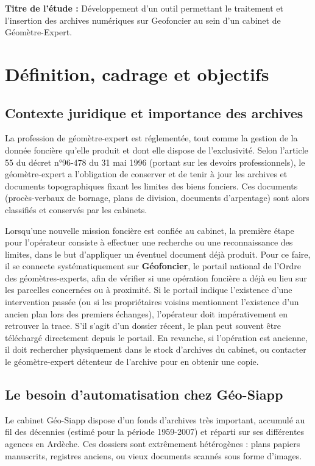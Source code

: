 \documentclass[a4paper,11pt]{article}
\newcommand{\titreEtude}{Développement d'un outil permettant le traitement et l'insertion des archives numériques sur Geofoncier au sein d'un cabinet de Géomètre-Expert}
\begin{document}
\begin{center}

\vspace{1em}

\textbf{Titre de l'étude :} \titreEtude.\\[0.5em]
\end{center}

\vspace{1em}

\section{Définition, cadrage et objectifs}

\subsection{Contexte juridique et importance des archives}
La profession de géomètre-expert est réglementée, tout comme la gestion de la donnée foncière qu'elle produit et dont elle dispose de l'exclusivité. Selon l'article 55 du décret n°96-478 du 31 mai 1996 (portant sur les devoirs professionnels), le géomètre-expert a l'obligation de conserver et de tenir à jour les archives et documents topographiques fixant les limites des biens fonciers. Ces documents (procès-verbaux de bornage, plans de division, documents d'arpentage) sont alors classifiés et conservés par les cabinets.

Lorsqu'une nouvelle mission foncière est confiée au cabinet, la première étape pour l'opérateur consiste à effectuer une recherche ou une reconnaissance des limites, dans le but d'appliquer un éventuel document déjà produit. Pour ce faire, il se connecte systématiquement sur \textbf{Géofoncier}, le portail national de l'Ordre des géomètres-experts, afin de vérifier si une opération foncière a déjà eu lieu sur les parcelles concernées ou à proximité. Si le portail indique l'existence d'une intervention passée (ou si les propriétaires voisins mentionnent l'existence d'un ancien plan lors des premiers échanges), l'opérateur doit impérativement en retrouver la trace. S'il s'agit d'un dossier récent, le plan peut souvent être téléchargé directement depuis le portail. En revanche, si l'opération est ancienne, il doit rechercher physiquement dans le stock d'archives du cabinet, ou contacter le géomètre-expert détenteur de l'archive pour en obtenir une copie.

\subsection{Le besoin d'automatisation chez Géo-Siapp}
Le cabinet Géo-Siapp dispose d'un fonds d'archives très important, accumulé au fil des décennies (estimé pour la période 1959-2007) et réparti sur ses différentes agences en Ardèche. Ces dossiers sont extrêmement hétérogènes : plans papiers manuscrits, registres anciens, ou vieux documents scannés sous forme d'images. 
\end{document}
